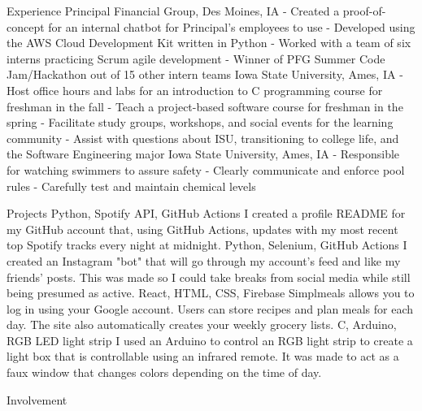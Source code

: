 \documentclass[]{resume}
\begin{document}
\begin{topic}{Experience}
    {Principal Financial Group, Des Moines, IA}
    {
        - Created a proof-of-concept for an internal chatbot for Principal's employees to use \newline
        - Developed using the AWS Cloud Development Kit written in Python \newline
        - Worked with a team of six interns practicing Scrum agile development  \newline
        - Winner of PFG Summer Code Jam/Hackathon out of 15 other intern teams
    }
    {Iowa State University, Ames, IA}
    {
        - Host office hours and labs for an introduction to C programming course for freshman in the fall \newline
        - Teach a project-based software course for freshman in the spring \newline
        - Facilitate study groups, workshops, and social events for the learning community \newline
        - Assist with questions about ISU, transitioning to college life, and the Software Engineering major
    }
    {Iowa State University, Ames, IA}
    {
        - Responsible for watching swimmers to assure safety \newline
        - Clearly communicate and enforce pool rules \newline
        - Carefully test and maintain chemical levels
    }\\
\end{topic}

\begin{topic}{Projects}
    {Python, Spotify API, GitHub Actions}
    {
        I created a profile README for my GitHub account that, using GitHub Actions, updates with my most recent top Spotify tracks every night at midnight.
    }
    {Python, Selenium, GitHub Actions}
    {
        I created an Instagram "bot" that will go through my account's feed and like my friends' posts. This was made so I could take breaks from social media while still being presumed as active.
    }
    {React, HTML, CSS, Firebase}
    {
        Simplmeals allows you to log in using your Google account. Users can store recipes and plan meals for each day. The site also automatically creates your weekly grocery lists.
    }
    {C, Arduino, RGB LED light strip}
    {
        I used an Arduino to control an RGB light strip to create a light box that is controllable using an infrared remote. It was made to act as a faux window that changes colors depending on the time of day.
    }\\
\end{topic}

\begin{topic}{Involvement}
\end{topic}
\end{document}
